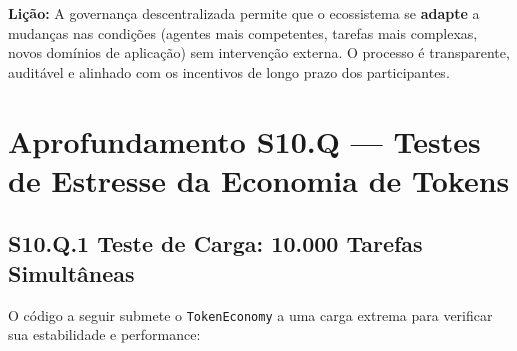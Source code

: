 \textbf{Lição:} A governança descentralizada permite que o ecossistema se \textbf{adapte} a mudanças nas condições (agentes mais competentes, tarefas mais complexas, novos domínios de aplicação) sem intervenção externa. O processo é transparente, auditável e alinhado com os incentivos de longo prazo dos participantes.


\section*{Aprofundamento S10.Q --- Testes de Estresse da Economia de Tokens}

\subsection*{S10.Q.1 Teste de Carga: 10.000 Tarefas Simultâneas}

O código a seguir submete o \texttt{TokenEconomy} a uma carga extrema para verificar sua estabilidade e performance:

